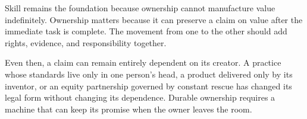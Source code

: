 Skill remains the foundation because ownership cannot manufacture value
indefinitely. Ownership matters because it can preserve a claim on value after
the immediate task is complete. The movement from one to the other should add
rights, evidence, and responsibility together.

Even then, a claim can remain entirely dependent on its creator. A practice
whose standards live only in one person's head, a product delivered only by its
inventor, or an equity partnership governed by constant rescue has changed its
legal form without changing its dependence. Durable ownership requires a
machine that can keep its promise when the owner leaves the room.
